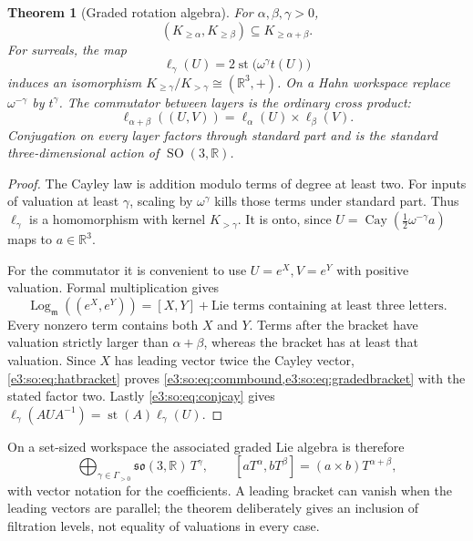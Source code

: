 \documentclass[11pt,letterpaper]{article}
\numberwithin{equation}{section}
\newtheorem{theorem}{Theorem}[section]
\theoremstyle{definition}
\theoremstyle{remark}
\newcommand{\R}{\mathbb R}
\newcommand{\mm}{\mathfrak m}
\newcommand{\st}{\operatorname{st}}
\newcommand{\SO}{\operatorname{SO}}
\newcommand{\so}{\mathfrak{so}}
\newcommand{\cay}{\operatorname{Cay}}
\newcommand{\Log}{\operatorname{Log}}
\newcommand{\comm}[2]{\left(#1,#2\right)}
\begin{document}
\begin{theorem}[Graded rotation algebra]\label{e3:so:thm:graded}
For \(\alpha,\beta,\gamma>0\),
\begin{equation}\label{e3:so:eq:commbound}
 \comm{K_{\ge\alpha}}{K_{\ge\beta}}\subseteq K_{\ge\alpha+\beta}.
\end{equation}
For surreals, the map
\begin{equation}\label{e3:so:eq:layer}
 \ell_\gamma(U)=2\st\bigl(\omega^\gamma t(U)\bigr)
\end{equation}
induces an isomorphism
\(K_{\ge\gamma}/K_{>\gamma}\cong(\R^3,+)\). On a Hahn workspace replace
\(\omega^{-\gamma}\) by \(t^\gamma\). The commutator between layers is the
ordinary cross product:
\begin{equation}\label{e3:so:eq:gradedbracket}
 \ell_{\alpha+\beta}(\comm{U}{V})
 =\ell_\alpha(U)\times\ell_\beta(V).
\end{equation}
Conjugation on every layer factors through standard part and is the standard
three-dimensional action of \(\SO(3,\R)\).
\end{theorem}
\begin{proof}
The Cayley law is addition modulo terms of degree at least two. For inputs of
valuation at least \(\gamma\), scaling by \(\omega^\gamma\) kills those terms
under standard part. Thus \(\ell_\gamma\) is a homomorphism with kernel
\(K_{>\gamma}\). It is onto, since
\(U=\cay(\tfrac12\omega^{-\gamma}a)\) maps to \(a\in\R^3\).

For the commutator it is convenient to use \(U=e^X,V=e^Y\) with positive
valuation. Formal multiplication gives
\[
 \Log_{\mm}(\comm{e^X}{e^Y})=[X,Y]
  +\text{Lie terms containing at least three letters}.
\]
Every nonzero term contains both \(X\) and \(Y\). Terms after the bracket have
valuation strictly larger than \(\alpha+\beta\), whereas the bracket has at
least that valuation. Since \(X\) has leading vector twice the Cayley vector,
\cref{e3:so:eq:hatbracket} proves \cref{e3:so:eq:commbound,e3:so:eq:gradedbracket} with the stated
factor two. Lastly \cref{e3:so:eq:conjcay} gives
\(\ell_\gamma(AUA^{-1})=\st(A)\ell_\gamma(U)\).
\end{proof}

On a set-sized workspace the associated graded Lie algebra is therefore
\[
 \bigoplus_{\gamma\in\Gamma_{>0}}\so(3,\R)\,T^\gamma,
 \qquad [aT^\alpha,bT^\beta]=(a\times b)T^{\alpha+\beta},
\]
with vector notation for the coefficients. A leading bracket can vanish when
the leading vectors are parallel; the theorem deliberately gives an inclusion
of filtration levels, not equality of valuations in every case.
\end{document}
